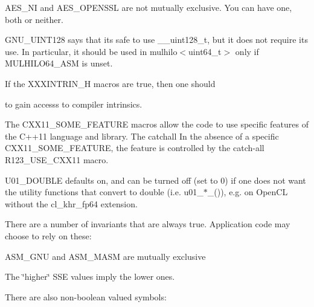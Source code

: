 A\+E\+S\+\_\+\+NI and A\+E\+S\+\_\+\+O\+P\+E\+N\+S\+SL are not mutually exclusive. You can have one, both or neither.

G\+N\+U\+\_\+\+U\+I\+N\+T128 says that it\textquotesingle{}s safe to use \+\_\+\+\_\+uint128\+\_\+t, but it does not require its use. In particular, it should be used in mulhilo$<$uint64\+\_\+t$>$ only if M\+U\+L\+H\+I\+L\+O64\+\_\+\+A\+SM is unset.

If the X\+X\+X\+I\+N\+T\+R\+I\+N\+\_\+H macros are true, then one should 
\begin{DoxyCode}{0}
\DoxyCodeLine{\textcolor{preprocessor}{\#include <xxxintrin.h>}}
\end{DoxyCode}
 to gain accesss to compiler intrinsics.

The C\+X\+X11\+\_\+\+S\+O\+M\+E\+\_\+\+F\+E\+A\+T\+U\+RE macros allow the code to use specific features of the C++11 language and library. The catchall In the absence of a specific C\+X\+X11\+\_\+\+S\+O\+M\+E\+\_\+\+F\+E\+A\+T\+U\+RE, the feature is controlled by the catch-\/all R123\+\_\+\+U\+S\+E\+\_\+\+C\+X\+X11 macro.

U01\+\_\+\+D\+O\+U\+B\+LE defaults on, and can be turned off (set to 0) if one does not want the utility functions that convert to double (i.\+e. u01\+\_\+$\ast$\+\_()), e.\+g. on Open\+CL without the cl\+\_\+khr\+\_\+fp64 extension.

There are a number of invariants that are always true. Application code may choose to rely on these\+:


\begin{DoxyItemize}
\item A\+S\+M\+\_\+\+G\+NU and A\+S\+M\+\_\+\+M\+A\+SM are mutually exclusive 
\item The \char`\"{}higher\char`\"{} S\+SE values imply the lower ones. 
\end{DoxyItemize}

There are also non-\/boolean valued symbols\+:


